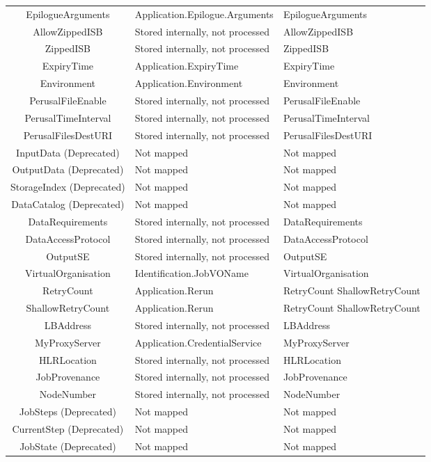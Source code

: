\documentclass{article}
\newcommand{\NM}{\normalsize{\textnormal{Not mapped}}}
\newcommand{\NST}[1]{\normalsize{\textnormal{#1}}}
\begin{document}
\begin{center}
\begin{tabularx}{\textwidth}{CTT}
EpilogueArguments & Application.Epilogue.Arguments & EpilogueArguments\\
AllowZippedISB & Stored internally, not processed & AllowZippedISB\\
ZippedISB & Stored internally, not processed & ZippedISB\\
ExpiryTime & Application.ExpiryTime & ExpiryTime\\
Environment & Application.Environment & Environment\\
PerusalFileEnable & \NST{Stored internally, not processed} & PerusalFileEnable\\
PerusalTimeInterval & \NST{Stored internally, not processed} & PerusalTimeInterval\\
PerusalFilesDestURI & \NST{Stored internally, not processed} & PerusalFilesDestURI\\
InputData \NST{(Deprecated)} & \NM & \NM\\
OutputData \NST{(Deprecated)} & \NM & \NM\\
StorageIndex \NST{(Deprecated)} & \NM & \NM\\
DataCatalog \NST{(Deprecated)} & \NM & \NM\\
DataRequirements & \NST{Stored internally, not processed} & DataRequirements\\
DataAccessProtocol & \NST{Stored internally, not processed} & DataAccessProtocol\\
OutputSE & \NST{Stored internally, not processed} & OutputSE\\
VirtualOrganisation & Identification.JobVOName & VirtualOrganisation\\
RetryCount & Application.Rerun & RetryCount ShallowRetryCount\\
ShallowRetryCount & Application.Rerun & RetryCount ShallowRetryCount\\
LBAddress & \NST{Stored internally, not processed} & LBAddress\\
MyProxyServer & Application.CredentialService & MyProxyServer\\
HLRLocation & \NST{Stored internally, not processed} & HLRLocation\\
JobProvenance & \NST{Stored internally, not processed} & JobProvenance\\
NodeNumber & \NST{Stored internally, not processed} & NodeNumber\\
JobSteps \NST{(Deprecated)} & \NM & \NM\\
CurrentStep \NST{(Deprecated)} & \NM & \NM\\
JobState \NST{(Deprecated)} & \NM & \NM\\

\end{tabularx}
\end{center}
\end{document}
